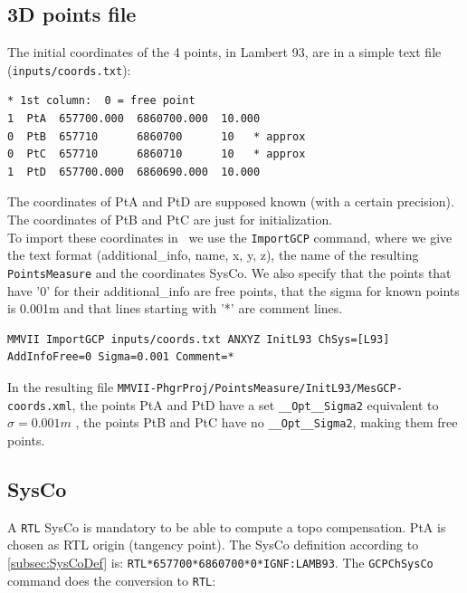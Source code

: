 
\subsection{3D points file}
The initial coordinates of the 4 points, in Lambert 93, are in a simple text file (\texttt{inputs/coords.txt}):

\begin{verbatim}
* 1st column:  0 = free point
1  PtA  657700.000  6860700.000  10.000
0  PtB  657710      6860700      10   * approx
0  PtC  657710      6860710      10   * approx
1  PtD  657700.000  6860690.000  10.000
\end{verbatim}

The coordinates of PtA and PtD are supposed known (with a certain precision).
The coordinates of PtB and PtC are just for initialization.
\\

To import these coordinates in \CdPPP\ we use the \texttt{ImportGCP} command, where we give the text format
(additional\_info, name, x, y, z), the name of the resulting \texttt{PointsMeasure} and the coordinates SysCo.
We also specify that the points that have '0' for their additional\_info are free points, that the sigma for
known points is 0.001m and that lines starting with '*' are comment lines.

\begin{lstlisting}
MMVII ImportGCP inputs/coords.txt ANXYZ InitL93 ChSys=[L93] AddInfoFree=0 Sigma=0.001 Comment=*
\end{lstlisting}

In the resulting file \texttt{MMVII-PhgrProj/PointsMeasure/InitL93/MesGCP-coords.xml},
the points PtA and PtD have a set \texttt{\_\_Opt\_\_Sigma2} equivalent to $\sigma = 0.001 m$ ,
the points PtB and PtC have no \texttt{\_\_Opt\_\_Sigma2}, making them free points.


\subsection{SysCo}

A \texttt{RTL} SysCo is mandatory to be able to compute a topo compensation.
PtA is chosen as RTL origin (tangency point).
The SysCo definition according to \ref{subsec:SysCoDef} is: \texttt{RTL*657700*6860700*0*IGNF:LAMB93}.
The \texttt{GCPChSysCo} command does the conversion to \texttt{RTL}:


